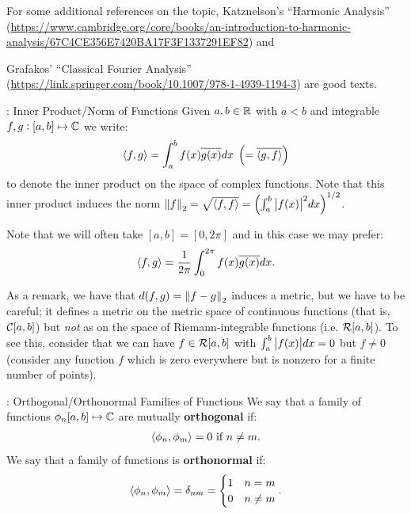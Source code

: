 For some additional references on the topic, Katznelson's ``Harmonic Analysis'' (\url{https://www.cambridge.org/core/books/an-introduction-to-harmonic-analysis/67C4CE356E7420BA17F3F1337291EF82}) and 

\noindent Grafakos' ``Classical Fourier Analysis'' (\url{https://link.springer.com/book/10.1007/978-1-4939-1194-3}) are good texts.

\begin{ndef}{: Inner Product/Norm of Functions}{}
    Given $a, b \in \mathbb{R}$ with $a < b$ and integrable $f, g: [a, b] \mapsto \mathbb{C}$ we write:
    \begin{align*}
        \left< f, g \right> = \int_a^b f(x)\overline{g(x)}dx \; \left(= \overline{\left< g, f \right>}\right)
    \end{align*}
    to denote the inner product on the space of complex functions. Note that this inner product induces the norm $\norm{f}_2 = \sqrt{\left< f, f \right>} = \left(\int_a^b \abs{f(x)}^2 dx\right)^{1/2}$. 

    Note that we will often take $[a, b] = [0, 2\pi]$ and in this case we may prefer:
    \begin{align*}
        \left< f, g \right> = \frac{1}{2\pi}\int_0^{2\pi}f(x)\overline{g(x)}dx.
    \end{align*} 
\end{ndef}
\noindent As a remark, we have that $d(f, g) = \norm{f - g}_2$ induces a metric, but we have to be careful; it defines a metric on the metric space of continuous functions (that is, $\mathcal{C}[a, b]$) but \emph{not} as on the space of Riemann-integrable functions (i.e. $\mathcal{R}[a, b]$). To see this, consider that we can have $f \in \mathcal{R}[a, b]$ with $\int_a^b \abs{f(x)}dx = 0$ but $f \neq 0$ (consider any function $f$ which is zero everywhere but is nonzero for a finite number of points). 

\begin{ndef}{: Orthogonal/Orthonormal Families of Functions}{}
    We say that a family of functions $\phi_n [a, b] \mapsto \mathbb{C}$ are mutually \textbf{orthogonal} if:
    \begin{align*}
        \left< \phi_n, \phi_m \right> = 0 \text{ if $n \neq m$.}
    \end{align*}
    We say that a family of functions is \textbf{orthonormal} if:
    \begin{align*}
        \left< \phi_n, \phi_m \right> = \delta_{nm} = \begin{cases}
            1 & n = m
            \\ 0 & n \neq m
        \end{cases}.
    \end{align*}
\end{ndef}

